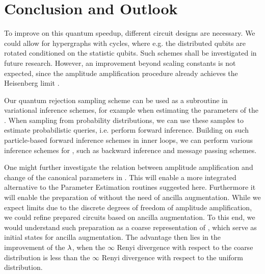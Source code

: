 \section{Conclusion and Outlook}


To improve on this quantum speedup, different circuit designs are necessary.
We could allow for hypergraphs with cycles, where e.g. the distributed qubits are rotated conditioned on the statistic qubits.
Such schemes shall be investigated in future research.
However, an improvement beyond scaling constants is not expected, since the amplitude amplification procedure already achieves the Heisenberg limit \cite{brassard_quantum_2002,zwierz_general_2010}.

Our quantum rejection sampling scheme can be used as a subroutine in variational inference schemes, for example when estimating the parameters of the \ComputationActivationNetwork{}.
When sampling from probability distributions, we can use these samples to estimate probabilistic queries, i.e. perform forward inference.
Building on such particle-based forward inference schemes in inner loops, we can perform various inference schemes for \ComputationActivationNetworks{}, such as backward inference and message passing schemes.

One might further investigate the relation between amplitude amplification and change of the canonical parameters in \HybridLogicNetwork{}.
This will enable a more integrated alternative to the Parameter Estimation routines suggested here.
Furthermore it will enable the preparation of \ComputationActivationNetworks{} without the need of ancilla augmentation.
While we expect limits due to the discrete degrees of freedom of amplitude amplification, we could refine prepared circuits based on ancilla augmentation.
To this end, we would understand such preparation as a coarse representation of \ComputationActivationNetworks{}, which serve as initial states for ancilla augmentation.
The advantage then lies in the improvement of the $\lambda$, when the $\infty$ Renyi divergence with respect to the coarse distribution is less than the $\infty$ Renyi divergence with respect to the uniform distribution.
